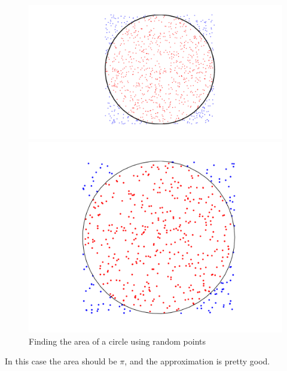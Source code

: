 \begin{figure}[h!]
\begin{center}
\begin{matlab}
\includegraphics[scale = .4]{./FiguresMAT/MCCircle}
\end{matlab}
\begin{python}
\includegraphics[scale = .4]{./Figures/MCCircle}
\end{python}
\caption{Finding the area of a circle using random points}
\label{Fig:MCCircle}
\end{center}
\end{figure}

In this case the area should be $\pi$, and the approximation is pretty good.

